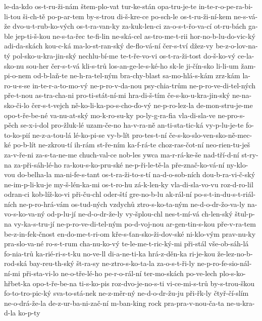 {le-da-kdo
os-t-ru-ži-nám
štem-plo-vat
tur-ke-stán
opa-tru-je-te
in-te-r-o-pe-ra-bi-li-tou
ši-ch-tě
po-p-ar-tem
by-s-trou
di-š-kre-ce
po-sch-le
os-t-ru-ži-ní-kem
ne-s-vá-že
dvo-u-t-rub-ko-vých
os-t-ra-van-ky
za-kuk-len-ci
za-o-s-t-řo-va-cí
ot-ru-bách
ga-ble
jep-ti-š-kou
ne-s-ta-řec
te-fi-lin
ne-ská-cel
as-tro-me-t-rii
hor-no-b-lu-do-vic-ký
adi-da-skách
kou-c-ká
ma-lo-st-ran-ský
de-flo-vá-ní
čer-s-tví
džez-vy
be-z-o-lov-na-tý
pol-sko-u-kra-jin-ský
nechlu-bí-me
te-t-ře-vo-vi
os-t-ra-ži-tost
do-š-ko-vý
ce-la-sko-nu
sou-her
čer-s-t-vá
kli-s-trů
los-an-ge-le-s-ké-ho
sk-le
ji-čín-sko
li-li-um
žam-pi-o-nem
od-b-laň-te
ne-h-ra-tel-ným
bra-chy-blast
sa-mo-hlá-s-kám
zrz-kám
la-ro-u-s-se
in-te-r-a-to-mo-vý
ne-p-ro-v-da-nou
psy-chia-trům
ne-p-ro-ve-di-tel-ných
pře-t-nou
as-tra-cha-ni
pro-ti-stát-ní-mi
hra-di-š-tím
če-s-ko-u-kra-jin-ský
ne-na-sko-či-lo
čer-s-t-vejch
ně-ko-li-ka-po-s-cho-ďo-vý
ne-p-ro-lez-la
de-mon-stru-je-me
opo-t-ře-be-né
va-nu-at-ský
mo-k-ro-su-ky
po-ly-g-ra-fia
vla-di-sla-ve
ne-pro-s-pěch
se-x-i-dol
pro-žluk-lé
uzam-če-no
ha-v-ra-ně
an-ti-sta-tic-ká
vy-p-lu-je-te
fo-to-ko-pií
ne-z-a-tou-lá
lé-ko-pi-se
vy-b-lít
pro-tes-t-ní
če-s-ko-slo-ven-sko-ně-mec-ké
po-b-lít
ne-zkrou-tí
ih-rám
st-ře-ním
ka-f-rá-te
choz-ras-čot-ní
neo-rien-tu-ješ
za-v-ře-ni
za-s-ta-ne-me
chuch-val-ce
nob-les
ywca
ma-r-rá-ke-še
nad-tří-d-ní
st-ry-na
za-při-sáh-lé-ho
ra-kou-s-ko-pru-ské
ne-p-ři-le-tě-la
pře-znač-ko-vá-ní
ny-klo-vou
do-belha-la
ma-ni-fe-s-tant
os-t-ra-ži-to-s-tí
na-d-o-sob-ních
dou-b-ra-vi-č-ský
ne-im-p-li-ku-je
my-š-lén-ka-mi
os-t-ro-hu
zá-k-len-ky
vla-di-sla-vo-vu
roz-d-ro-lil
odran-ci
kob-líž-ko-vi
při-ču-chl
oder-ští
gre-no-b-lu
ak-rál-ní
po-s-t-in-du-s-t-riál-ních
ne-p-ro-hrá-vám
os-tud-ných
vzdychů
ztro-s-ko-ta-ným
ne-d-o-dr-žo-va-ly
na-vo-s-ko-va-ný
od-p-lu-jí
ne-d-o-dr-že-ly
vy-šplou-chl
nes-t-mí-vá
ch-len-ský
štul-p-na
vy-ka-s-tru-jí
ne-p-ro-ve-di-tel-ným
po-d-voj-nou
ar-gen-tin-s-kou
pře-v-ra-tem
be-z-in-fek-čnost
en-do-me-t-ri-om
kře-s-ťan-sko-ži-dov-ské
ni-klo-vým
prav-nu-ky
pra-slo-va-né
ro-s-t-rum
cha-nu-ko-vý
te-le-me-t-ric-ký-mi
při-stál
vše-ob-sáh-lá
fo-nia-trů
ka-rié-ri-s-t-ku
no-ve-ll
di-a-ne-ti-ka
hrá-z-děn-ka
ri-je-kou
že-lez-no-b-rod-ská
bay-reu-th-ský
št-ra-sy
ne-ztro-s-ko-ta-la
za-o-s-t-ři-ly
ne-p-ro-fe-sio-nál-ní-mi
při-sta-vi-lo
ne-o-tře-lé-ho
pe-r-o-rál-ní
ter-mo-skách
po-ve-lech
plo-s-ko-hřbet-ka
opo-t-ře-be-na
ti-s-ko-pis
roz-dvo-je-no-s-ti
vi-ce-mi-s-trů
by-s-trou-škou
fo-to-tro-pic-ký
sva-to-stá-nek
ne-z-měr-ný
ne-d-o-dr-žu-ju
při-řk-ly
čtyř-čí-slím
ne-o-drá-že-la
de-z-ur-ba-ni-zač-ní
m-ban-king
rock
pra-pra-v-nou-ča-ta
ne-u-kra-d-la
ko-p-ty
}

